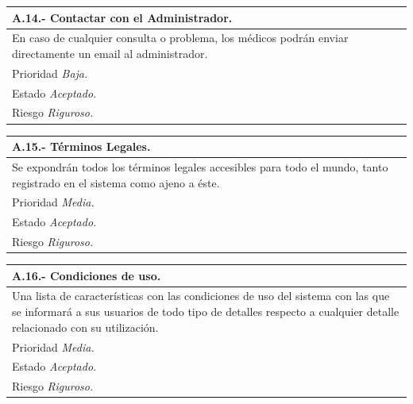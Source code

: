 \documentclass[a4paper,oneside,11pt]{book}
\begin{document}
\begin{center}
\begin{tabulary}{15cm}{|L|}
	\hline
		\bf{A.14.- Contactar con el Administrador.} \\
	\hline
		En caso de cualquier consulta o problema, los médicos podrán enviar directamente un email al administrador. \\
	\hline
		Prioridad \textit{Baja.} \\
	\hline
		Estado \textit{Aceptado.} \\
	\hline
		Riesgo \textit{Riguroso.} \\
	\hline
\end{tabulary}
\end{center}

\begin{center}
\begin{tabulary}{15cm}{|L|}
	\hline
		\bf{A.15.- Términos Legales.} \\
	\hline
		Se expondrán todos los términos legales accesibles para todo el mundo, tanto registrado en el sistema como ajeno a éste. \\
	\hline
		Prioridad \textit{Media.} \\
	\hline
		Estado \textit{Aceptado.} \\
	\hline
		Riesgo \textit{Riguroso.} \\
	\hline
\end{tabulary}
\end{center}

\begin{center}
\begin{tabulary}{15cm}{|L|}
	\hline
		\bf{A.16.- Condiciones de uso.} \\
	\hline
		Una lista de características con las condiciones de uso del sistema con las que se informará a sus usuarios de todo tipo de detalles respecto a cualquier detalle relacionado con su utilización. \\
	\hline
		Prioridad \textit{Media.} \\
	\hline
		Estado \textit{Aceptado.} \\
	\hline
		Riesgo \textit{Riguroso.} \\
	\hline
\end{tabulary}
\end{center}
\end{document}
